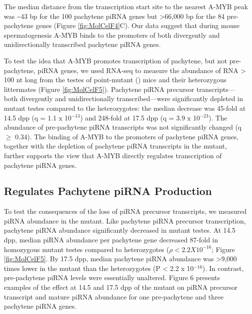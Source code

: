     The median distance from the transcription start site to the nearest A-MYB peak was \textasciitilde43 bp for the 100 pachytene piRNA genes but >66,000 bp for the 84 pre-pachytene genes (Figure \ref{fig:MolCelF4}C). Our data suggest that during mouse spermatogenesis A-MYB binds to the promoters of both divergently and unidirectionally transcribed pachytene piRNA genes.

    To test the idea that A-MYB promotes transcription of pachytene, but not pre-pachytene, piRNA genes, we used RNA-seq to measure the abundance of RNA > 100 nt long from the testes of \amyb{} point-mutant (\mybrepro) mice and their heterozygous littermates (Figure \ref{fig:MolCelF5}). Pachytene piRNA precursor transcripts—both divergently and unidirectionally transcribed—were significantly depleted in \amyb{} mutant testes compared to the heterozygotes: the median decrease was 45-fold at 14.5 dpp (q = 1.1 x 10$^{-13}$) and 248-fold at 17.5 dpp (q = 3.9 x 10$^{-23}$). The abundance of pre-pachytene piRNA transcripts was not significantly changed (q $\ge $ 0.34). The binding of A-MYB to the promoters of pachytene piRNA genes, together with the depletion of pachytene piRNA transcripts in the \amyb{} mutant, further supports the view that A-MYB directly regulates transcription of pachytene piRNA genes.

  \subsection{\amyb{} Regulates Pachytene piRNA Production}

    To test the consequences of the loss of piRNA precursor transcripts, we measured piRNA abundance in the \amyb{} mutant. Like pachytene piRNA precursor transcription, pachytene piRNA abundance significantly decreased in mutant testes. At 14.5 dpp, median piRNA abundance per pachytene gene decreased 87-fold in \amyb{} homozygous mutant testes compared to heterozygotes ($\rho < 2.2 X 10^{-16}$; Figure \ref{fig:MolCelF5}. By 17.5 dpp, median pachytene piRNA abundance was >9,000 times lower in the \amyb{} mutant than the heterozygotes (P < 2.2 x 10$^{-16}$). In contrast, pre-pachytene piRNA levels were essentially unaltered. Figure 6 presents examples of the effect at 14.5 and 17.5 dpp of the \amyb{} mutant on piRNA precursor transcript and mature piRNA abundance for one pre-pachytene and three pachytene piRNA genes.

